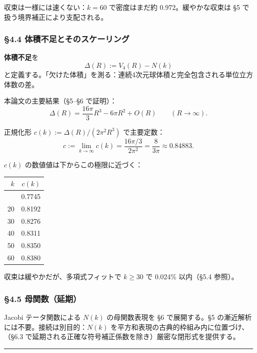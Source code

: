 \documentclass[a4paper,11pt]{ltjsarticle}
\theoremstyle{definition}
\begin{document}
収束は一様には速くない：\(k = 60\) で密度はまだ約
\(0.972\)。緩やかな収束は §5 で扱う境界補正により支配される。

\subsubsection{§4.4
体積不足とそのスケーリング}\label{ux4f53ux7a4dux4e0dux8db3ux3068ux305dux306eux30b9ux30b1ux30fcux30eaux30f3ux30b0}

\textbf{体積不足}を \[\Delta(R) := V_4(R) - N(k)\]
と定義する。「欠けた体積」を測る：連続4次元球体積と完全包含される単位立方体数の差。

本論文の主要結果（§5--§6 で証明）：
\[\Delta(R) = \frac{16\pi}{3} R^3 - 6\pi R^2 + O(R) \qquad (R \to \infty).\]

正規化形 \(c(k) := \Delta(R)/(2\pi^2 R^3)\) で主要定数：
\[\boxed{\;c := \lim_{k \to \infty} c(k) = \frac{16\pi/3}{2\pi^2} = \frac{8}{3\pi} \approx 0.84883.\;}\]

\(c(k)\) の数値値は下からこの極限に近づく：

{\def\LTcaptype{none} %
\begin{longtable}[]{@{}rr@{}}
\toprule\noalign{}
\(k\) & \(c(k)\) \\
\midrule\noalign{}
\endhead
\bottomrule\noalign{}
\endlastfoot
10 & 0.7745 \\
20 & 0.8192 \\
30 & 0.8276 \\
40 & 0.8311 \\
50 & 0.8350 \\
60 & 0.8380 \\
\end{longtable}
}

収束は緩やかだが、多項式フィットで \(k \ge 30\) で 0.024\% 以内（§5.4
参照）。

\subsubsection{§4.5
母関数（延期）}\label{ux6bcdux95a2ux6570ux5ef6ux671f}

Jacobi テータ関数による \(N(k)\) の母関数表現を §6 で展開する。§5
の漸近解析には不要。接続は別目的：\(N(k)\)
を平方和表現の古典的枠組み内に位置づけ、（§6.3
で延期される正確な符号補正係数を除き）厳密な閉形式を提供する。

\begin{center}\rule{0.5\linewidth}{0.5pt}\end{center}
\end{document}
